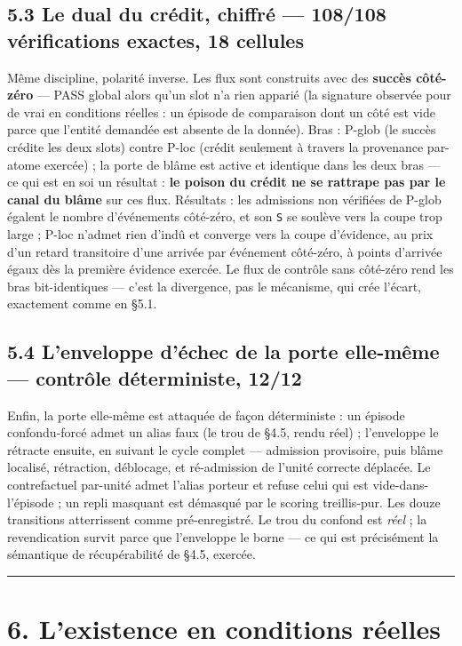 \documentclass[11pt]{article}
\begin{document}
\subsection*{5.3 Le dual du crédit, chiffré — 108/108 vérifications exactes, 18 cellules}

Même discipline, polarité inverse. Les flux sont construits avec des \textbf{succès côté-zéro} — PASS global alors qu'un slot n'a rien apparié (la signature observée pour de vrai en conditions réelles : un épisode de comparaison dont un côté est vide parce que l'entité demandée est absente de la donnée). Bras : P-glob (le succès crédite les deux slots) contre P-loc (crédit seulement à travers la provenance par-atome exercée) ; la porte de blâme est active et identique dans les deux bras — ce qui est en soi un résultat : \textbf{le poison du crédit ne se rattrape pas par le canal du blâme} sur ces flux. Résultats : les admissions non vérifiées de P-glob égalent le nombre d'événements côté-zéro, et son \texttt{S} se soulève vers la coupe trop large ; P-loc n'admet rien d'indû et converge vers la coupe d'évidence, au prix d'un retard transitoire d'une arrivée par événement côté-zéro, à points d'arrivée égaux dès la première évidence exercée. Le flux de contrôle sans côté-zéro rend les bras bit-identiques — c'est la divergence, pas le mécanisme, qui crée l'écart, exactement comme en §5.1.

\subsection*{5.4 L'enveloppe d'échec de la porte elle-même — contrôle déterministe, 12/12}

Enfin, la porte elle-même est attaquée de façon déterministe : un épisode confondu-forcé admet un alias faux (le trou de §4.5, rendu réel) ; l'enveloppe le rétracte ensuite, en suivant le cycle complet — admission provisoire, puis blâme localisé, rétraction, déblocage, et ré-admission de l'unité correcte déplacée. Le contrefactuel par-unité admet l'alias porteur et refuse celui qui est vide-dans-l'épisode ; un repli masquant est démasqué par le scoring treillis-pur. Les douze transitions atterrissent comme pré-enregistré. Le trou du confond est \emph{réel} ; la revendication survit parce que l'enveloppe le borne — ce qui est précisément la sémantique de récupérabilité de §4.5, exercée.

\medskip\hrule\medskip

\section*{6. L'existence en conditions réelles}
\end{document}
